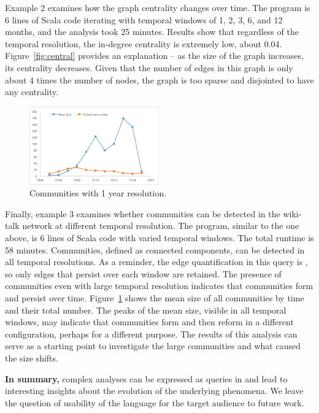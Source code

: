 Example 2 examines how the graph centrality changes over time.  The
program is 6 lines of Scala code iterating with temporal windows of 1,
2, 3, 6, and 12 months, and the analysis took 25 minutes.  Results
show that regardless of the temporal resolution, the in-degree
centrality is extremely low, about 0.04.  Figure~\ref{fig:central}
provides an explanation -- as the size of the graph increases, its
centrality decreases.  Given that the number of edges in this graph is
only about 4 times the number of nodes, the graph is too sparse and
disjointed to have any centrality.


\begin{figure}
\centering
\includegraphics[width=2.2in]{figs/communities.png}
\caption{Communities with 1 year resolution.}
\label{fig:commun}
\end{figure}

Finally, example 3 examines whether communities can be detected in the
wiki-talk network at different temporal resolution.  The program,
similar to the one above, is 6 lines of Scala code with varied
temporal windows.  The total runtime is 58 minutes.  Communities,
defined as connected components, can be detected in all temporal
resolutions.  As a reminder, the edge quantification in this query is
, so only edges that persist over each window are
retained.  The presence of communities even with large temporal
resolution indicates that communities form and persist over time.
Figure~\ref{fig:commun} shows the mean size of all communities by time
and their total number.  The peaks of the mean size, visible in all
temporal windows, may indicate that communities form and then reform
in a different configuration, perhaps for a different purpose.  The
results of this analysis can serve as a starting point to investigate
the large communities and what caused the size shifts.

{\bf In summary,} complex analyses can be expressed as queries in \ql
and lead to interesting insights about the evolution of the underlying
phenomena.  We leave the question of usability of the language for the
target audience to future work.
